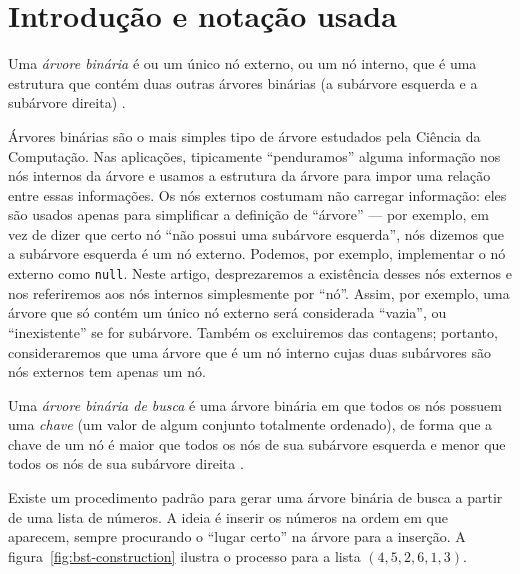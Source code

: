 \section{Introdução e notação usada}

\begin{definition}
    Uma \emph{árvore binária}
    é ou um único nó externo,
    ou um nó interno,
    que é uma estrutura que contém duas outras árvores binárias
    (a subárvore esquerda e a subárvore direita)
    \cite[p.~257]{SedgewickFlajolet2013}.
\end{definition}

Árvores binárias são o mais simples tipo de árvore
estudados pela Ciência da Computação.
Nas aplicações,
tipicamente ``penduramos'' alguma informação nos nós internos da árvore
e usamos a estrutura da árvore para impor uma relação entre essas informações.
Os nós externos costumam não carregar informação:
eles são usados apenas para simplificar a definição de ``árvore''
--- por exemplo,
em vez de dizer que certo nó ``não possui uma subárvore esquerda'',
nós dizemos que a subárvore esquerda é um nó externo.
Podemos, por exemplo,
implementar o nó externo como \texttt{null}.
Neste artigo,
desprezaremos a existência desses nós externos
e nos referiremos aos nós internos simplesmente por ``nó''.
Assim, por exemplo,
uma árvore que só contém um único nó externo
será considerada ``vazia'', ou ``inexistente'' se for subárvore.
Também os excluiremos das contagens;
portanto, consideraremos que
uma árvore que é um nó interno cujas duas subárvores são nós externos
tem apenas um nó.

\begin{definition}
    Uma \emph{árvore binária de busca}
    é uma árvore binária em que todos os nós possuem uma \emph{chave}
    (um valor de algum conjunto totalmente ordenado),
    de forma que a chave de um nó
    é maior que todos os nós de sua subárvore esquerda
    e menor que todos os nós de sua subárvore direita
    \cite[p.~282]{SedgewickFlajolet2013}.
\end{definition}

Existe um procedimento padrão para gerar uma árvore binária de busca
a partir de uma lista de números.
A ideia é inserir os números na ordem em que aparecem,
sempre procurando o ``lugar certo'' na árvore para a inserção.
A figura~\ref{fig:bst-construction} ilustra o processo para a lista $(4, 5, 2, 6, 1, 3)$.

